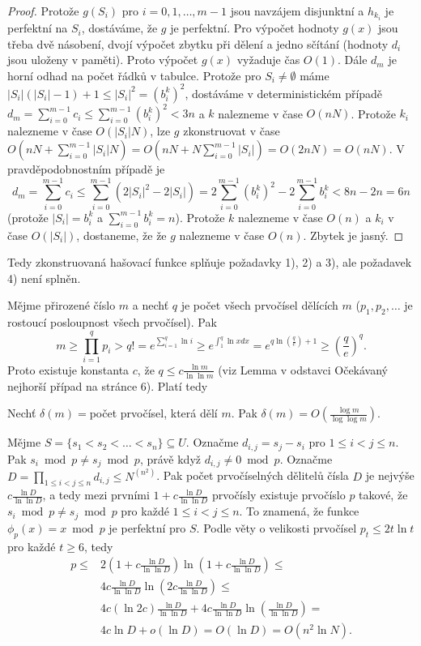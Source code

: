 \documentclass[a4paper,12pt]{article}
\begin{document}
\begin{proof}Protože $g(S_i)$ pro $i=0,1,\dots,m-1$ 
jsou navzájem disjunktní a $h_{k_i}$ je perfektní na $S_
i$, 
dostáváme, že $g$ je perfektní. Pro výpočet hodnoty $
g(x)$ 
jsou třeba dvě násobení, dvojí výpočet zbytku při 
dělení a jedno sčítání (hodnoty $d_i$ jsou uloženy v 
paměti). Proto výpočet $g(x)$ vyžaduje čas $O(1)$. Dále 
$d_m$ je horní odhad na počet řádků v tabulce. 
Protože pro $S_i\ne\emptyset$ máme $|S_i|(|S_i|-1)+1\le |S_
i|^2=(b_i^k)^2$, 
dostáváme v deterministickém případě 
$d_m=\sum_{i=0}^{m-1}c_i\le\sum_{i=0}^{m-1}(b_i^k)^2<3n$ a $k$ nalezneme v čase 
$O(nN)$. Protože $k_i$ nalezneme v čase $O(|S_i|N)$, lze $g$ 
zkonstruovat v čase 
$O(nN+\sum_{i=0}^{m-1}|S_i|N)=O(nN+N\sum_{i=0}^{m-1}|S_i|)=O(2nN)
=O(nN)$. 
V pravděpodob\-nostním případě je 
$$d_m=\sum_{i=0}^{m-1}c_i\le\sum_{i=0}^{m-1}(2|S_i|^2-2|S_i|)=2\sum_{
i=0}^{m-1}(b_i^k)^2-2\sum_{i=0}^{m-1}b_i^k<8n-2n=6n$$
(protože $|S_i|=b_i^k$ a $\sum_{i=0}^{m-1}b_i^k=n$). Protože $
k$ nalezneme v čase $O(n)$ a $k_i$ v čase $O(|S_i|)$, dostaneme, že 
že $g$ nalezneme v čase $O(n)$. Zbytek je jasný.
\end{proof}

Tedy zkonstruovaná hašovací funkce splňuje požadavky 
1), 2) a 3), ale požadavek 4) není splněn. 

Mějme přirozené číslo $m$ a nechť $q$ je počet všech prvočísel 
dělících $m$ ($p_1,p_2,\dots$ je rostoucí posloupnost všech 
prvočísel). Pak
$$m\ge\prod_{i=1}^qp_i>q!=e^{\sum_{i=1}^q\ln i}\ge e^{\int_1^q\ln 
xdx}=e^{q\ln(\frac qe)+1}\ge (\frac qe)^q.$$
Proto existuje konstanta $c$, že $q\le c\frac {\ln m}{\ln\ln m}$ (viz Lemma v odstavci Očekávaný 
nejhorší případ na stránce 6). Platí tedy  
\begin{veta}Nechť $\delta (m)=$počet prvočísel, která dělí 
$m$. Pak $\delta (m)=O(\frac {\log m}{\log\log m})$.
\end{veta}

Mějme $S=\{s_1<s_2<\dots<s_n\}\subseteq U$. Označme 
$d_{i,j}=s_j-s_i$ pro $1\le i<j\le n$. Pak $s_i\bmod p\ne s_j\bmod 
p$, 
právě když $d_{i,j}\ne 0\bmod p$. Označme 
$D=\prod_{1\le i<j\le n}d_{i,j}\le N^{(n^2)}$. Pak počet prvočíselných 
dělitelů čísla $D$ je nejvýše $c\frac {\ln 
D}{\ln\ln D}$, a tedy mezi 
prvními $1+c\frac {\ln D}{\ln\ln D}$ prvočísly existuje prvočíslo $
p$ 
takové, že $s_i\bmod p\ne s_j\bmod p$ pro každé $1\le i
<j\le n$. 
To znamená, že funkce $\phi_p(x)=x\bmod p$ je perfektní pro 
$S$. Podle věty o velikosti prvočísel $p_t\le 2t\ln t$ pro každé $
t\ge 6$, tedy
\begin{align*} p\le&2(1+c\frac {\ln D}{\ln\ln D})\ln(1+c\frac {\ln D}{\ln\ln 
D})\le\\
&4c\frac {\ln D}{\ln\ln D}\ln(2c\frac {\ln D}{\ln\ln D})\le\\
&4c(\ln2c)\frac {\ln D}{\ln\ln D}+4c\frac {\ln D}{\ln\ln D}\ln(\frac {\ln 
D}{\ln\ln D})=\\
&4c\ln D+o(\ln D)=O(\ln D)=O(n^2\ln N).\end{align*}
\end{document}
